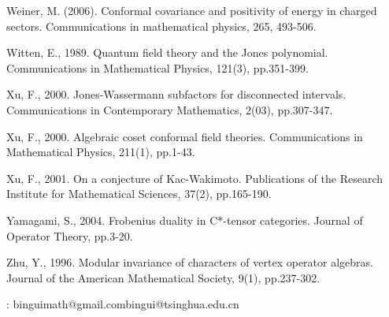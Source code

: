 \documentclass[11pt,b5paper,notitlepage]{article}
\theoremstyle{definition}
\theoremstyle{plain}
\numberwithin{equation}{subsection}
\begin{document}
\begin{thebibliography}{999999}
Weiner, M. (2006). Conformal covariance and positivity of energy in charged sectors. Communications in mathematical physics, 265, 493-506.

Witten, E., 1989. Quantum field theory and the Jones polynomial. Communications in Mathematical Physics, 121(3), pp.351-399.

Xu, F., 2000. Jones-Wassermann subfactors for disconnected intervals. Communications in Contemporary Mathematics, 2(03), pp.307-347.

Xu, F., 2000. Algebraic coset conformal field theories. Communications in Mathematical Physics, 211(1), pp.1-43.

Xu, F., 2001. On a conjecture of Kac-Wakimoto. Publications of the Research Institute for Mathematical Sciences, 37(2), pp.165-190.

Yamagami, S., 2004. Frobenius duality in C*-tensor categories. Journal of Operator Theory, pp.3-20.

Zhu, Y., 1996. Modular invariance of characters of vertex operator algebras. Journal of the American Mathematical Society, 9(1), pp.237-302.


	
\end{thebibliography}

: binguimath@gmail.com\qquad bingui@tsinghua.edu.cn
\end{document}
